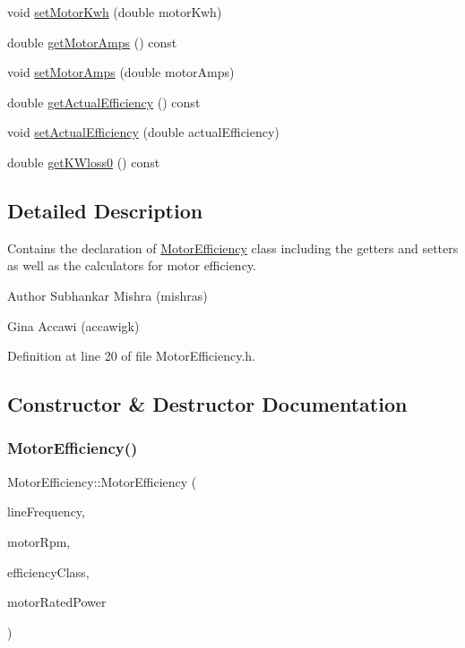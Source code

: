 \begin{DoxyCompactItemize}
\item 
void \hyperlink{class_motor_efficiency_ab1c7507bac259565e43a6777d079148b}{set\+Motor\+Kwh} (double motor\+Kwh)
\item 
double \hyperlink{class_motor_efficiency_a955906509a4b49274b35c1b119c4a4b4}{get\+Motor\+Amps} () const
\item 
void \hyperlink{class_motor_efficiency_ac86aa8d6162e63eb440e07e557534c74}{set\+Motor\+Amps} (double motor\+Amps)
\item 
double \hyperlink{class_motor_efficiency_ae40031307b8631cf40df1c4069069dc0}{get\+Actual\+Efficiency} () const
\item 
void \hyperlink{class_motor_efficiency_a7a5ad8d01fdc0a3bf93d952752487496}{set\+Actual\+Efficiency} (double actual\+Efficiency)
\item 
double \hyperlink{class_motor_efficiency_a47398ac8203f5b79a0ca435673a4bc16}{get\+K\+Wloss0} () const
\end{DoxyCompactItemize}


\subsection{Detailed Description}
Contains the declaration of \hyperlink{class_motor_efficiency}{Motor\+Efficiency} class including the getters and setters as well as the calculators for motor efficiency. 

\begin{DoxyAuthor}{Author}
Subhankar Mishra (mishras) 

Gina Accawi (accawigk) 
\end{DoxyAuthor}


Definition at line 20 of file Motor\+Efficiency.\+h.



\subsection{Constructor \& Destructor Documentation}
\mbox{\label{class_motor_efficiency_a04625cbf2e8e6fea0fb1d005bd36808c}} 
\subsubsection{\texorpdfstring{Motor\+Efficiency()}{MotorEfficiency()}}
{\footnotesize\ttfamily Motor\+Efficiency\+::\+Motor\+Efficiency (\begin{DoxyParamCaption}\item[{Motor\+::\+Line\+Frequency}]{line\+Frequency,  }\item[{double}]{motor\+Rpm,  }\item[{Motor\+::\+Efficiency\+Class}]{efficiency\+Class,  }\item[{double}]{motor\+Rated\+Power }\end{DoxyParamCaption})\hspace{0.3cm}{\ttfamily [inline]}}


